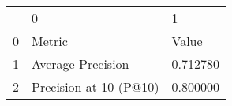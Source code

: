 \begin{tabular}{lll}
 & 0 & 1 \\
0 & Metric & Value \\
1 & Average Precision & 0.712780 \\
2 & Precision at 10 (P@10) & 0.800000 \\
\end{tabular}
